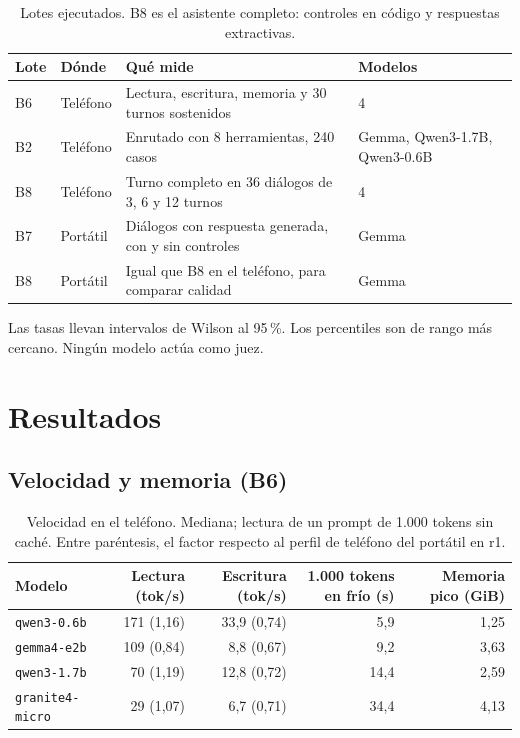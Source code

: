 \documentclass[11pt,a4paper]{article}
\newcommand{\m}[1]{\texttt{#1}}
\begin{document}
\begin{table}[H]
\centering\small
\caption{Lotes ejecutados. B8 es el asistente completo: controles en código y respuestas extractivas.}\label{tab:batches}
\begin{tabularx}{\textwidth}{@{}llLl@{}}
\toprule
Lote & Dónde & Qué mide & Modelos\\
\midrule
B6 & Teléfono & Lectura, escritura, memoria y 30 turnos sostenidos & 4\\
B2 & Teléfono & Enrutado con 8 herramientas, 240 casos & Gemma, Qwen3-1.7B, Qwen3-0.6B\\
B8 & Teléfono & Turno completo en 36 diálogos de 3, 6 y 12 turnos & 4\\
B7 & Portátil & Diálogos con respuesta generada, con y sin controles & Gemma\\
B8 & Portátil & Igual que B8 en el teléfono, para comparar calidad & Gemma\\
\bottomrule
\end{tabularx}
\end{table}

Las tasas llevan intervalos de Wilson al 95\,\%. Los percentiles son de rango más cercano. Ningún modelo actúa como juez.

\section{Resultados}

\subsection{Velocidad y memoria (B6)}

\begin{table}[H]
\centering\small
\caption{Velocidad en el teléfono. Mediana; lectura de un prompt de 1.000 tokens sin caché. Entre paréntesis, el factor respecto al perfil de teléfono del portátil en r1.}\label{tab:speed}
\begin{tabularx}{\textwidth}{@{}lRRRR@{}}
\toprule
Modelo & Lectura (tok/s) & Escritura (tok/s) & 1.000 tokens en frío (s) & Memoria pico (GiB)\\
\midrule
\m{qwen3-0.6b} & 171 (1,16) & 33,9 (0,74) & 5,9 & 1,25\\
\m{gemma4-e2b} & 109 (0,84) & 8,8 (0,67) & 9,2 & 3,63\\
\m{qwen3-1.7b} & 70 (1,19) & 12,8 (0,72) & 14,4 & 2,59\\
\m{granite4-micro} & 29 (1,07) & 6,7 (0,71) & 34,4 & 4,13\\
\bottomrule
\end{tabularx}
\end{table}
\end{document}
